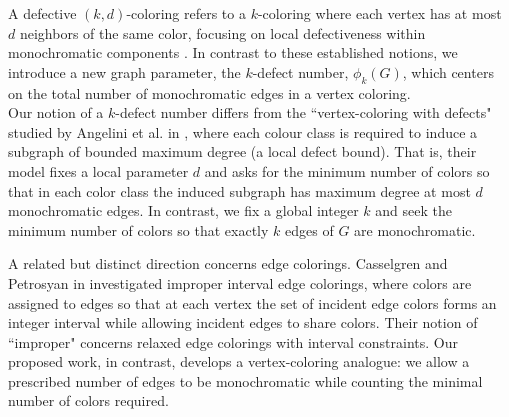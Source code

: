 \documentclass[12pt]{amsart}
\theoremstyle{definition}
\theoremstyle{remark}
\numberwithin{equation}{section}
\begin{document}
A defective $(k,d)$-coloring refers to a $k$-coloring where each vertex has at most $d$ neighbors of the same color, focusing on local defectiveness within monochromatic components \cite{CWJ}. In contrast to these established notions, we introduce a new graph parameter, the $k$-defect number, \(\phi _{k}(G)\), which centers on the total number of monochromatic edges in a vertex coloring. \\

Our notion of a $k$-defect number differs from the ``vertex-coloring with defects" studied by Angelini et al. in \cite{ANG}, where each colour class is required to induce a subgraph of bounded maximum degree (a local defect bound). That is, their model fixes a local parameter $d$ and asks for the minimum number of colors so that in each color class the induced subgraph has maximum degree at most $d$ monochromatic edges. In contrast, we fix a global integer $k$ and seek the minimum number of colors so that exactly $k$ edges of $G$ are monochromatic.

A related but distinct direction concerns edge colorings. Casselgren and Petrosyan in \cite{INT} investigated improper interval edge colorings, where colors are assigned to edges so that at each vertex the set of incident edge colors forms an integer interval while allowing incident edges to share colors. Their notion of ``improper" concerns relaxed edge colorings with interval constraints.
Our proposed work, in contrast, develops a vertex-coloring analogue: we allow a prescribed number of edges to be monochromatic while counting the minimal number of colors required. \\




\end{document}
